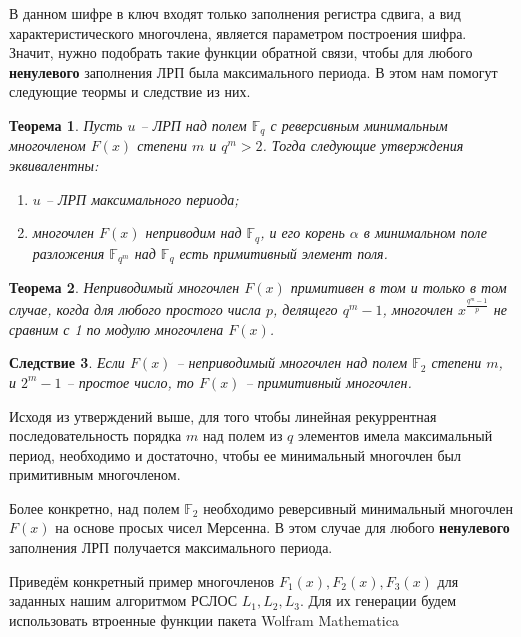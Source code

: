 \documentclass[a4paper,12pt]{article}
\newtheorem{theorem}{Теорема}[section]
\newtheorem{corollary}[theorem]{Следствие}
\theoremstyle{definition}
\begin{document}
	В данном шифре в ключ входят только заполнения регистра сдвига, а вид характеристического многочлена, является параметром построения шифра. Значит, нужно подобрать такие функции обратной связи, чтобы для любого \textbf{ненулевого} заполнения ЛРП была максимального периода. В этом нам помогут следующие теормы и следствие из них.
	
	\begin{theorem}
		Пусть $u$ – ЛРП над полем $\mathbb{F}_q$ с реверсивным минимальным многочленом $F(x)$ степени $m$ и $q^m > 2$. Тогда следующие утверждения эквивалентны:
		\begin{enumerate}[topsep=0pt, itemsep=0pt, parsep=0pt, label=(\arabic*)]
			\item $u$ – ЛРП максимального периода;
			\item многочлен $F(x)$ неприводим над $\mathbb{F}_q$, и его корень $\alpha$ в минимальном поле разложения $\mathbb{F}_{q^m}$ над $\mathbb{F}_q$ есть примитивный элемент поля.
		\end{enumerate}
	\end{theorem}

	\begin{theorem}
		Неприводимый многочлен $F(x)$ примитивен в том и только в том случае, когда для любого простого числа $p$, делящего $q^m - 1$, 
		многочлен $x^{\frac{q^m - 1}{p}}$ не сравним с 1 по модулю многочлена $F(x)$.

	\end{theorem}
	
	\begin{corollary}
		Если $F(x)$ -- неприводимый многочлен над полем $\mathbb{F}_2$ степени $m$, и $2^m - 1$ -- простое число, то $F(x)$ -- примитивный многочлен.

	\end{corollary}

	Исходя из утверждений выше, для того чтобы линейная рекуррентная последовательность порядка $m$ над полем из $q$ элементов имела
	максимальный период, необходимо и достаточно, чтобы ее минимальный многочлен был примитивным многочленом.
	
	Более конкретно, над полем $\mathbb{F}_2$ необходимо реверсивный минимальный многочлен $F(x)$ на основе просых чисел Мерсенна. В этом случае для любого \textbf{ненулевого} заполнения ЛРП получается максимального периода.
	
	Приведём конкретный пример многочленов $F_1(x), F_2(x), F_3(x)$ для заданных нашим алгоритмом РСЛОС $L_1, L_2, L_3$. Для их генерации будем использовать втроенные функции пакета Wolfram Mathematica 
	
\end{document}
